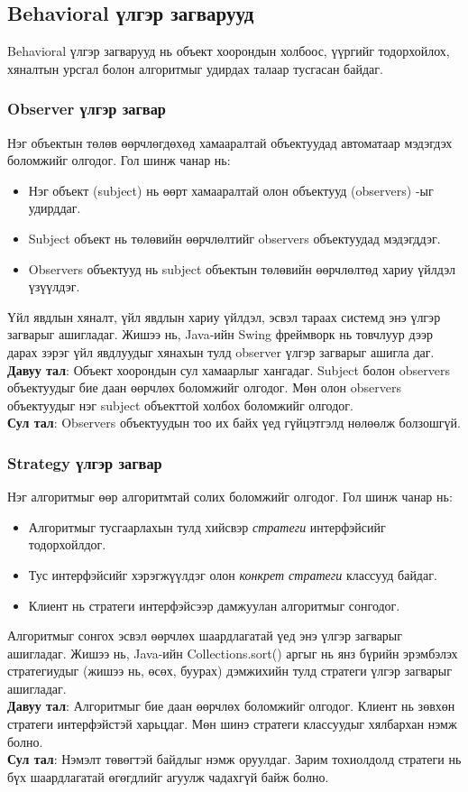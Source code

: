 \subsection{Behavioral үлгэр загварууд}
Behavioral үлгэр загварууд нь объект хоорондын холбоос, үүргийг тодорхойлох, хяналтын урсгал болон алгоритмыг удирдах талаар тусгасан байдаг.

\subsubsection{Observer үлгэр загвар}
\quad \quad Нэг объектын төлөв өөрчлөгдөхөд хамааралтай объектуудад автоматаар мэдэгдэх боломжийг олгодог. Гол шинж чанар нь:
\begin{itemize}
	\item Нэг объект (subject) нь өөрт хамааралтай олон объектууд (observers) -ыг удирддаг.
	\item Subject объект нь төлөвийн өөрчлөлтийг observers объектуудад мэдэгддэг.
	\item Observers объектууд нь subject объектын төлөвийн өөрчлөлтөд хариу үйлдэл үзүүлдэг.
\end{itemize}
Үйл явдлын хяналт, үйл явдлын хариу үйлдэл, эсвэл тараах системд энэ үлгэр загварыг ашигладаг. Жишээ нь, Java-ийн Swing фреймворк нь товчлуур дээр дарах зэрэг үйл явдлуудыг хянахын тулд observer үлгэр загварыг ашигла	даг.\\
\textbf{Давуу тал}: Объект хоорондын сул хамаарлыг хангадаг. Subject болон observers объектуудыг бие даан өөрчлөх боломжийг олгодог. Мөн олон observers объектуудыг нэг subject объекттой холбох боломжийг олгодог.\\
\textbf{Сул тал}: Observers объектуудын тоо их байх үед гүйцэтгэлд нөлөөлж болзошгүй.	

\subsubsection{Strategy үлгэр загвар}	
\quad \quad Нэг алгоритмыг өөр алгоритмтай солих боломжийг олгодог. Гол шинж чанар нь:
\begin{itemize}
	\item Алгоритмыг тусгаарлахын тулд хийсвэр \textit{стратеги} интерфэйсийг тодорхойлдог.
	\item Тус интерфэйсийг хэрэгжүүлдэг олон \textit{конкрет стратеги} классууд байдаг.
	\item Клиент нь стратеги интерфэйсээр дамжуулан алгоритмыг сонгодог.
\end{itemize}
Алгоритмыг сонгох эсвэл өөрчлөх шаардлагатай үед энэ үлгэр загварыг ашигладаг. Жишээ нь, Java-ийн Collections.sort() аргыг нь янз бүрийн эрэмбэлэх стратегиудыг (жишээ нь, өсөх, буурах) дэмжихийн тулд стратеги үлгэр загварыг ашигладаг.\\
\textbf{Давуу тал}: Алгоритмыг бие даан өөрчлөх боломжийг олгодог. Клиент нь зөвхөн стратеги интерфэйстэй харьцдаг. Мөн шинэ стратеги классуудыг хялбархан нэмж болно.\\
\textbf{Сул тал}: Нэмэлт төвөгтэй байдлыг нэмж оруулдаг. Зарим тохиолдолд стратеги нь бүх шаардлагатай өгөгдлийг агуулж чадахгүй байж болно.

